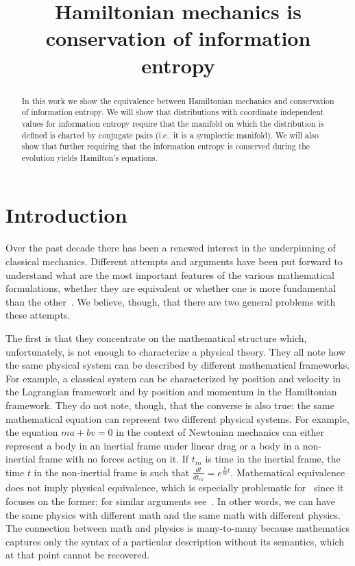 \documentclass[11pt]{elsarticle}
\begin{document}
\title{Hamiltonian mechanics is conservation of information entropy}

\begin{abstract}
	In this work we show the equivalence between Hamiltonian mechanics and conservation of information entropy. We will show that distributions with coordinate independent values for information entropy require that the manifold on which the distribution is defined is charted by conjugate pairs (i.e.~it is a symplectic manifold). We will also show that further requiring that the information entropy is conserved during the evolution yields Hamilton's equations.
\end{abstract}

\maketitle

\tableofcontents
\newpage

\section{Introduction}

Over the past decade there has been a renewed interest in the underpinning of classical mechanics. Different attempts and arguments have been put forward to understand what are the most important features of the various mathematical formulations, whether they are equivalent or whether one is more fundamental than the other~\cite{North,Curiel,Barrett1,Barrett2}. We believe, though, that there are two general problems with these attempts.

The first is that they concentrate on the mathematical structure which, unfortunately, is not enough to characterize a physical theory. They all note how the same physical system can be described by different mathematical frameworks. For example, a classical system can be characterized by position and velocity in the Lagrangian framework and by position and momentum in the Hamiltonian framework. They do not note, though, that the converse is also true: the same mathematical equation can represent two different physical systems. For example, the equation $ma + bv = 0$ in the context of Newtonian mechanics can either represent a body in an inertial frame under linear drag or a body in a non-inertial frame with no forces acting on it. If $t_{in}$ is time in the inertial frame, the time $t$ in the non-inertial frame is such that  $\frac{dt}{dt_{in}} = e^{\frac{b}{m}t}$. Mathematical equivalence does not imply physical equivalence, which is especially problematic for~\cite{Barrett2} since it focuses on the former; for similar arguments see~\cite{Coffey}. In other words, we can have the same physics with different math and the same math with different physics. The connection between math and physics is many-to-many because mathematics captures only the syntax of a particular description without its semantics, which at that point cannot be recovered.
\end{document}
